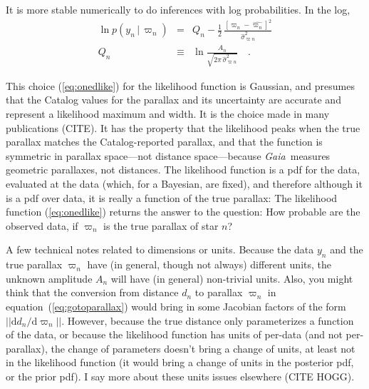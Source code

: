\documentclass[12pt, modern]{aastex62}
\newcommand{\Gaia}{\textsl{Gaia}}
\newcommand{\equationname}{equation}
\newcommand{\dd}{\mathrm{d}}
\newcommand{\given}{\,|\,}
\begin{document}
It is more stable numerically to do inferences with log probabilities.
In the log,
\begin{eqnarray}
\ln p(y_n\given\varpi_n) &=& Q_n - \frac{1}{2}\,\frac{[\varpi_n - \hat{\varpi_n}]^2}{\hat{\sigma}^2_{\varpi n}}
\\
Q_n &\equiv& \ln\frac{A_n}{\sqrt{2\pi\,\hat{\sigma}^2_{\varpi n}}}
\quad .
\end{eqnarray}

This choice (\ref{eq:onedlike}) for the likelihood function is Gaussian,
and presumes that the
Catalog values for the parallax and its uncertainty are accurate and represent
a likelihood maximum and width.
It is the choice made in many publications (CITE).
It has the property that the likelihood peaks when the true parallax
matches the Catalog-reported parallax,
and that the function is symmetric in parallax space---not distance space---because
\Gaia\ measures geometric parallaxes, not distances.
The likelihood function is a pdf for the data, evaluated at the data (which,
for a Bayesian, are fixed), and therefore although it is a pdf over data,
it is really a function of the true parallax:
The likelihood function (\ref{eq:onedlike}) returns the answer to the question:
How probable are the observed data, if $\varpi_n$ is the true parallax of
star $n$?

A few technical notes related to dimensions or units.
Because the data $y_n$ and
the true parallax $\varpi_n$ have (in general, though not always) different units,
the unknown amplitude $A_n$ will have (in general) non-trivial units.
Also, you might think
that the conversion from distance $d_n$ to parallax $\varpi_n$
in \equationname~(\ref{eq:gotoparallax})
would bring in some Jacobian factors of the form $||\dd d_n/\dd\varpi_n||$.
However, because the true distance only parameterizes a function of the data,
or because the likelihood function has units of per-data (and not per-parallax),
the change of parameters doesn't bring a change of units, at least not in the
likelihood function (it would bring a change of units in the posterior pdf, or the
prior pdf).
I say more about these units issues elsewhere (CITE HOGG).
\end{document}
